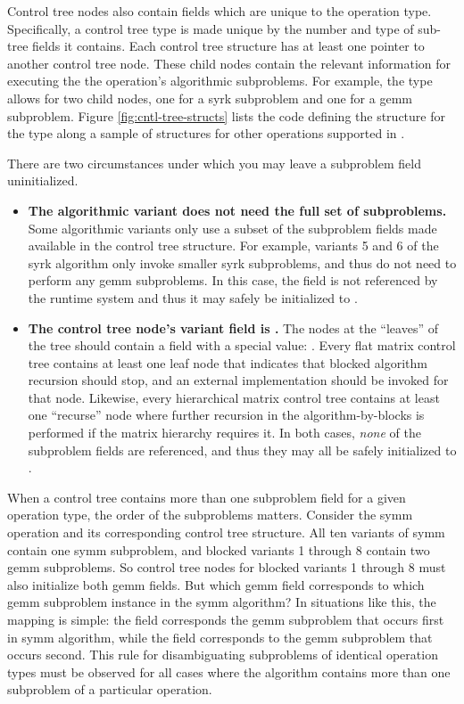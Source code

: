 Control tree nodes also contain fields which are unique to the operation
type.
Specifically, a control tree type is made unique by the number and type
of sub-tree fields it contains.
Each control tree structure has at least one pointer to another control
tree node.
These child nodes contain the relevant information for executing the
the operation's algorithmic subproblems.
For example, the \flasyrkt type allows for two child nodes, one for a
{\sc syrk} subproblem and one for a {\sc gemm} subproblem.
Figure \ref{fig:cntl-tree-structs} lists the code defining the
structure for the \flasyrkt type along a sample of structures
for other operations supported in \libflamens.

There are two circumstances under which you may leave a subproblem
field uninitialized.
\begin{itemize}
\item
{\bf The algorithmic variant does not need the full set of subproblems.}
Some algorithmic variants only use a subset of the subproblem fields made
available in the control tree structure.
For example, variants 5 and 6 of the {\sc syrk} algorithm only invoke
smaller {\sc syrk} subproblems, and thus do not need to perform any
{\sc gemm} subproblems.
In this case, the \subgemm field is not referenced by the runtime system
and thus it may safely be initialized to \fnullns.
\item
{\bf The control tree node's variant field is \flasubproblemns.}
The nodes at the ``leaves'' of the tree should contain a \variant field
with a special value: \flasubproblemns.
Every flat matrix control tree contains at least one leaf node that
indicates that blocked algorithm recursion should stop, and an
external implementation should be invoked for that node.
Likewise, every hierarchical matrix control tree contains at least one
``recurse'' node where further recursion in the algorithm-by-blocks is
performed if the matrix hierarchy requires it.
In both cases, {\em none} of the subproblem fields are referenced, and thus
they may all be safely initialized to \fnullns.
\end{itemize}

When a control tree contains more than one subproblem field for a given
operation type, the order of the subproblems matters.
Consider the {\sc symm} operation and its corresponding control tree
structure.
All ten variants of {\sc symm} contain one {\sc symm} subproblem, and
blocked variants 1 through 8 contain two {\sc gemm} subproblems.
So control tree nodes for blocked variants 1 through 8
must also initialize both {\sc gemm} fields.
But which {\sc gemm} field corresponds to which {\sc gemm} subproblem
instance in the {\sc symm} algorithm?
In situations like this, the mapping is simple: the \subgemmo field
corresponds the {\sc gemm} subproblem that occurs first in {\sc symm}
algorithm, while the \subgemmtw field corresponds to the {\sc gemm}
subproblem that occurs second.
This rule for disambiguating subproblems of identical operation types
must be observed for all cases where the algorithm contains more than
one subproblem of a particular operation.



